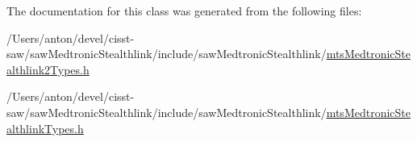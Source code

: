 The documentation for this class was generated from the following files\+:\begin{DoxyCompactItemize}
\item 
/\+Users/anton/devel/cisst-\/saw/saw\+Medtronic\+Stealthlink/include/saw\+Medtronic\+Stealthlink/\hyperlink{mts_medtronic_stealthlink2_types_8h}{mts\+Medtronic\+Stealthlink2\+Types.\+h}\item 
/\+Users/anton/devel/cisst-\/saw/saw\+Medtronic\+Stealthlink/include/saw\+Medtronic\+Stealthlink/\hyperlink{mts_medtronic_stealthlink_types_8h}{mts\+Medtronic\+Stealthlink\+Types.\+h}\end{DoxyCompactItemize}
